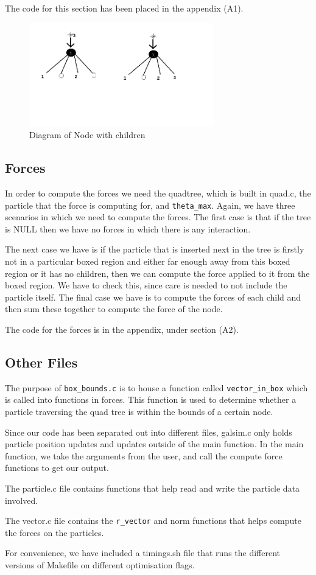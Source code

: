The code for this section has been placed in the appendix (A1).
\begin{figure}[htb]
    \begin{center}
        \includegraphics[width=8cm]{../images/children.png}
        \caption{Diagram of Node with children}
    \end{center}
\end{figure}

\newpage
\subsection{Forces}
In order to compute the forces we need the quadtree, which is built in quad.c, the particle that the force is computing for, and \verb|theta_max|. Again, we have three scenarios in which we need to compute the forces. The first case is that if the tree is NULL then we have no forces in which there is any interaction.

The next case we have is if the particle that is inserted next in the tree is firstly not in a particular boxed region and either far enough away from this boxed region or it has no children, then we can compute the force applied to it from the boxed region. We have to check this, since care is needed to not include the particle itself.
The final case we have is to compute the forces of each child and then sum these together to compute the force of the node.

The code for the forces is in the appendix, under section (A2).

\subsection{Other Files}
The purpose of \verb|box_bounds.c| is to house a function called \verb|vector_in_box| which is called into functions in forces. This function is used to determine whether a particle traversing the quad tree is within the bounds of a certain node.

Since our code has been separated out into different files, galsim.c only holds particle position updates and updates outside of the main function. In the main function, we take the arguments from the user, and call the compute force functions to get our output.

The particle.c file contains functions that help read and write the particle data involved.

The vector.c file contains the \verb|r_vector| and norm functions that helps compute the forces on the particles.

For convenience, we have included a timings.sh file that runs the different versions of Makefile on different optimisation flags.
\newpage
